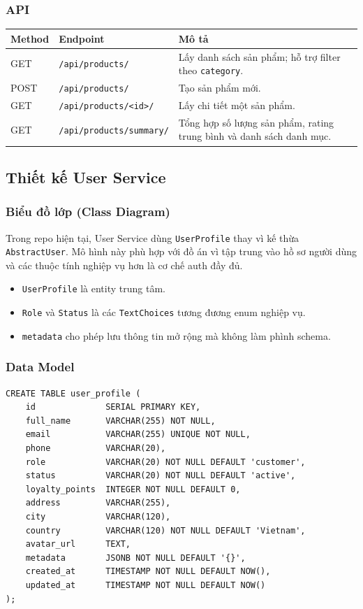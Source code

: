 \documentclass[12pt,a4paper]{article}
\begin{document}
\subsubsection{API}
\begin{longtable}{p{3.2cm}p{3.4cm}p{6.8cm}}
\toprule
\textbf{Method} & \textbf{Endpoint} & \textbf{Mô tả} \\
\midrule
GET & \texttt{/api/products/} & Lấy danh sách sản phẩm; hỗ trợ filter theo \texttt{category}. \\
POST & \texttt{/api/products/} & Tạo sản phẩm mới. \\
GET & \texttt{/api/products/\textless id\textgreater/} & Lấy chi tiết một sản phẩm. \\
GET & \texttt{/api/products/summary/} & Tổng hợp số lượng sản phẩm, rating trung bình và danh sách danh mục. \\
\bottomrule
\end{longtable}

\subsection{Thiết kế User Service}
\subsubsection{Biểu đồ lớp (Class Diagram)}
Trong repo hiện tại, User Service dùng \texttt{UserProfile} thay vì kế thừa \texttt{AbstractUser}. Mô hình này phù hợp với đồ án vì tập trung vào hồ sơ người dùng và các thuộc tính nghiệp vụ hơn là cơ chế auth đầy đủ.

\begin{itemize}
  \item \texttt{UserProfile} là entity trung tâm.
  \item \texttt{Role} và \texttt{Status} là các \texttt{TextChoices} tương đương enum nghiệp vụ.
  \item \texttt{metadata} cho phép lưu thông tin mở rộng mà không làm phình schema.
\end{itemize}

\subsubsection{Data Model}
\begin{lstlisting}[style=code,caption={Data model rút gọn của User Service}]
CREATE TABLE user_profile (
    id              SERIAL PRIMARY KEY,
    full_name       VARCHAR(255) NOT NULL,
    email           VARCHAR(255) UNIQUE NOT NULL,
    phone           VARCHAR(20),
    role            VARCHAR(20) NOT NULL DEFAULT 'customer',
    status          VARCHAR(20) NOT NULL DEFAULT 'active',
    loyalty_points  INTEGER NOT NULL DEFAULT 0,
    address         VARCHAR(255),
    city            VARCHAR(120),
    country         VARCHAR(120) NOT NULL DEFAULT 'Vietnam',
    avatar_url      TEXT,
    metadata        JSONB NOT NULL DEFAULT '{}',
    created_at      TIMESTAMP NOT NULL DEFAULT NOW(),
    updated_at      TIMESTAMP NOT NULL DEFAULT NOW()
);
\end{lstlisting}
\end{document}
